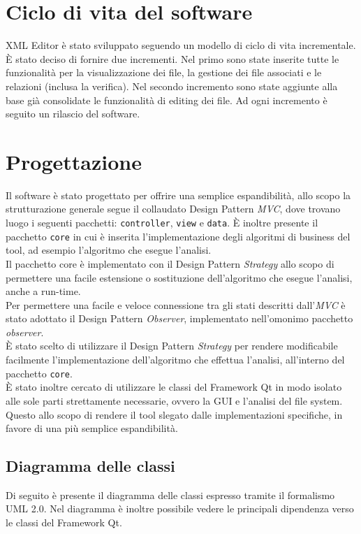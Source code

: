 	\section{Ciclo di vita del software}
		XML Editor è stato sviluppato seguendo un modello di ciclo di vita incrementale. È stato deciso di fornire due incrementi. Nel primo sono state inserite tutte le funzionalità per la visualizzazione dei file, la gestione dei file associati e le relazioni (inclusa la verifica). Nel secondo incremento sono state aggiunte alla base già consolidate le funzionalità di editing dei file. Ad ogni incremento è seguito un rilascio del software.

\section{Progettazione}
	Il software è stato progettato per offrire una semplice espandibilità, allo scopo la strutturazione generale segue il collaudato Design Pattern \textit{MVC}, dove trovano luogo i seguenti pacchetti: \texttt{controller}, \texttt{view} e \texttt{data}. È inoltre presente il pacchetto \texttt{core} in cui è inserita l'implementazione degli algoritmi di business del tool, ad esempio l'algoritmo che esegue l'analisi.\\
	
	Il pacchetto core è implementato con il Design Pattern \textit{Strategy} allo scopo di permettere una facile estensione o sostituzione dell'algoritmo che esegue l'analisi, anche a run-time.\\
	
	Per permettere una facile e veloce connessione tra gli stati descritti dall'\textit{MVC} è stato adottato il Design Pattern \textit{Observer}, implementato nell'omonimo pacchetto \textit{observer}.\\
	
	È stato scelto di utilizzare il Design Pattern \textit{Strategy} per rendere modificabile facilmente l'implementazione dell'algoritmo che effettua l'analisi, all'interno del pacchetto \texttt{core}.\\
	
	È stato inoltre cercato di utilizzare le classi del Framework Qt in modo isolato alle sole parti strettamente necessarie, ovvero la GUI e l'analisi del file system. Questo allo scopo di rendere il tool slegato dalle implementazioni specifiche, in favore di una più semplice espandibilità.

	\subsection{Diagramma delle classi}
		Di seguito è presente il diagramma delle classi espresso tramite il formalismo UML 2.0. Nel diagramma è inoltre possibile vedere le principali dipendenza verso le classi del Framework Qt.

